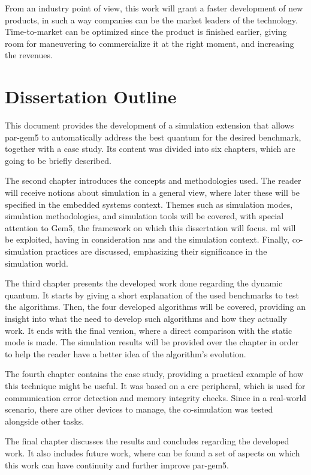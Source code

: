  From an industry point of view, this work will grant a faster development of new products, in such a way companies can be the market leaders 
 of the technology. Time-to-market can be optimized since the product is finished earlier, giving room for maneuvering to commercialize it at the 
 right moment, and increasing the revenues.
 
\section{Dissertation Outline}

This document provides the development of a simulation extension that allows par-gem5 to automatically address the best quantum for the desired 
benchmark, together with a case study. Its content was divided into six chapters, which are going to be briefly described.

The second chapter introduces the concepts and methodologies used. The reader will receive notions about simulation in a general view, where 
later these will be specified in the embedded systems context. Themes such as simulation modes, simulation methodologies, and simulation tools 
will be covered, with special attention to Gem5, the framework on which this dissertation will focus. \gls{ml} will be exploited, having in 
consideration \glspl{nn} and the simulation context. Finally, co-simulation practices are discussed, emphasizing their significance in the 
simulation world.

The third chapter presents the developed work done regarding the dynamic quantum. It starts by giving a short explanation of the used benchmarks
to test the algorithms. Then, the four developed algorithms will be covered, providing an insight into what the need to develop 
such algorithms and how they actually work. It ends with the final version, where a direct comparison with the static mode is made. The 
simulation results will be provided over the chapter in order to help the reader have a better idea of the algorithm's evolution.

The fourth chapter contains the case study, providing a practical example of how this technique might be useful. It was based on a \gls{crc} 
peripheral, which is used for communication error detection and memory integrity checks. Since in a real-world scenario, there are other 
devices to manage, the co-simulation was tested alongside other tasks.

The final chapter discusses the results and concludes regarding the developed work. It also includes future work, where can be found a set of 
aspects on which this work can have continuity and further improve par-gem5. 

